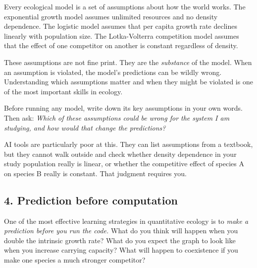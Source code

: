 \documentclass[
  letterpaper,
  DIV=11,
  numbers=noendperiod]{scrreprt}
\begin{document}
Every ecological model is a set of assumptions about how the world
works. The exponential growth model assumes unlimited resources and no
density dependence. The logistic model assumes that per capita growth
rate declines linearly with population size. The Lotka-Volterra
competition model assumes that the effect of one competitor on another
is constant regardless of density.

These assumptions are not fine print. They are the \emph{substance} of
the model. When an assumption is violated, the model's predictions can
be wildly wrong. Understanding which assumptions matter and when they
might be violated is one of the most important skills in ecology.

\begin{tcolorbox}[enhanced jigsaw, toprule=.15mm, colframe=quarto-callout-tip-color-frame, bottomrule=.15mm, arc=.35mm, breakable, leftrule=.75mm, rightrule=.15mm, bottomtitle=1mm, coltitle=black, left=2mm, titlerule=0mm, title=\textcolor{quarto-callout-tip-color}{\faLightbulb}\hspace{0.5em}{A Useful Habit}, toptitle=1mm, colbacktitle=quarto-callout-tip-color!10!white, opacityback=0, colback=white, opacitybacktitle=0.6]

Before running any model, write down its key assumptions in your own
words. Then ask: \emph{Which of these assumptions could be wrong for the
system I am studying, and how would that change the predictions?}

\end{tcolorbox}

AI tools are particularly poor at this. They can list assumptions from a
textbook, but they cannot walk outside and check whether density
dependence in your study population really is linear, or whether the
competitive effect of species A on species B really is constant. That
judgment requires you.

\subsection{4. Prediction before
computation}\label{prediction-before-computation}

One of the most effective learning strategies in quantitative ecology is
to \emph{make a prediction before you run the code.} What do you think
will happen when you double the intrinsic growth rate? What do you
expect the graph to look like when you increase carrying capacity? What
will happen to coexistence if you make one species a much stronger
competitor?
\end{document}
